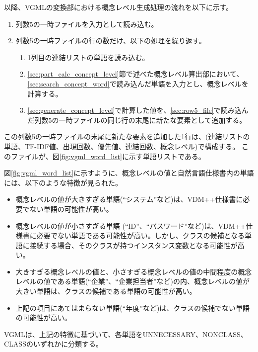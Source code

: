 以降、VGMLの変換部における概念レベル生成処理の流れを以下に示す。

\begin{enumerate}
    \item 列数5の一時ファイルを入力として読み込む。
    \label{sec:row5_file}
    \item 列数5の一時ファイルの行の数だけ、以下の処理を繰り返す。
        \begin{enumerate}
            \item 1列目の連結リストの単語を読み込む。
            \label{sec:search_concept_word}
            \item \ref{sec:part_calc_concept_level}節で述べた概念レベル算出部において、\ref{sec:search_concept_word}で読み込んだ単語を入力とし、概念レベルを計算する。
            \label{sec:generate_concept_level}
            \item \ref{sec:generate_concept_level}で計算した値を、\ref{sec:row5_file}で読み込んだ列数5の一時ファイルの同じ行の末尾に新たな要素として追加する。
        \end{enumerate}
\end{enumerate}

この列数5の一時ファイルの末尾に新たな要素を追加した1行は、(連結リストの単語、TF-IDF値、出現回数、優先値、連結回数、概念レベル)で構成する。
このファイルが、図\ref{fig:vgml_word_list}に示す単語リストである。

図\ref{fig:vgml_word_list}に示すように、概念レベルの値と自然言語仕様書内の単語には、以下のような特徴が見られた。

\begin{itemize}
    \item 概念レベルの値が大きすぎる単語(``システム''など)は、VDM++仕様書に必要でない単語の可能性が高い。
    \item 概念レベルの値が小さすぎる単語 (``ID''、``パスワード''など)は、VDM++仕様書に必要でない単語である可能性が高い。しかし、クラスの候補となる単語に接続する場合、そのクラスが持つインスタンス変数となる可能性が高い。
    \item 大きすぎる概念レベルの値と、小さすぎる概念レベルの値の中間程度の概念レベルの値である単語(``企業''、``企業担当者''など)の内、概念レベルの値が大きい単語は、クラスの候補である単語の可能性が高い。
    \item 上記の項目にあてはまらない単語(``年度''など)は、クラスの候補でない単語の可能性が高い。
\end{itemize}

VGMLは、上記の特徴に基づいて、各単語をUNNECESSARY、NONCLASS、CLASSのいずれかに分類する。

